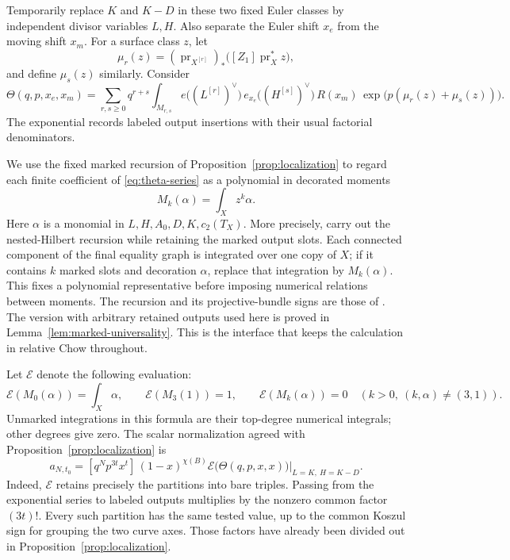 Temporarily replace \(K\) and \(K-D\) in these two fixed Euler
classes by independent divisor variables \(L,H\). Also separate the
Euler shift \(x_e\) from the moving shift \(x_m\). For a surface
class \(z\), let
\[
 \mu_r(z)=
 (\operatorname{pr}_{X^{[r]}})_*
 \bigl([Z_1]\operatorname{pr}_X^*z\bigr),
\]
and define \(\mu_s(z)\) similarly. Consider
\begin{equation}\label{eq:theta-series}
 \Theta(q,p,x_e,x_m)
 =
 \sum_{r,s\geq0}q^{r+s}
 \int_{M_{r,s}}
 e\bigl((L^{[r]})^\vee\bigr)\,
 e_{x_e}\bigl((H^{[s]})^\vee\bigr)\,
 R(x_m)\,
 \exp\bigl(p(\mu_r(z)+\mu_s(z))\bigr).
\end{equation}
The exponential records labeled output insertions with their usual
factorial denominators.

We use the fixed marked recursion of
Proposition~\ref{prop:localization} to regard each finite coefficient
of \eqref{eq:theta-series} as a polynomial in decorated moments
\[
 M_k(\alpha)=\int_X z^k\alpha.
\]
Here \(\alpha\) is a monomial in
\(L,H,A_0,D,K,c_2(T_X)\).
More precisely, carry out the nested-Hilbert recursion while retaining
the marked output slots. Each connected component of the final
equality graph is integrated over one copy of \(X\); if it contains
\(k\) marked slots and decoration \(\alpha\), replace that integration
by \(M_k(\alpha)\). This fixes a polynomial representative before
imposing numerical relations between moments. The recursion and its
projective-bundle signs are those of
\cite[Sections 1 and 3]{EGL}.
The version with arbitrary retained outputs used here is proved in
Lemma~\ref{lem:marked-universality}. This is the interface that keeps
the calculation in relative Chow throughout.

Let \(\mathcal E\) denote the following evaluation:
\begin{equation}\label{eq:bare-moments}
 \mathcal E(M_0(\alpha))=\int_X\alpha,\qquad
 \mathcal E(M_3(1))=1,\qquad
 \mathcal E(M_k(\alpha))=0
 \quad(k>0,\ (k,\alpha)\neq(3,1)).
\end{equation}
Unmarked integrations in this formula are their top-degree numerical
integrals; other degrees give zero.
The scalar normalization agreed with
Proposition~\ref{prop:localization} is
\begin{equation}\label{eq:scalar-coefficient}
 a_{N,t_0}
 =
 [q^N p^{3t}x^t]\,
 (1-x)^{\chi(B)}
 \mathcal E\bigl(\Theta(q,p,x,x)\bigr)
 \big|_{L=K,\ H=K-D}.
\end{equation}
Indeed, \(\mathcal E\) retains precisely the partitions into bare
triples. Passing from the exponential series to labeled outputs
multiplies by the nonzero common factor \((3t)!\).
Every such partition has the same tested value, up to the common
Koszul sign for grouping the two curve axes. Those factors have
already been divided out in Proposition~\ref{prop:localization}.

